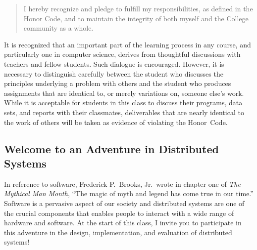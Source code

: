 \vspace*{-.1in}
\begin{quote}
I hereby recognize and pledge to fulfill my responsibilities, as defined in the Honor Code, and to maintain the
integrity of both myself and the College community as a whole.
\end{quote}
\vspace*{-.15in}

\noindent It is recognized that an important part of the learning process in any course, and particularly one in
computer science, derives from thoughtful discussions with teachers and fellow students.  Such dialogue is encouraged.
However, it is necessary to distinguish carefully between the student who discusses the principles underlying a problem
with others and the student who produces assignments that are identical to, or merely variations on, someone else's
work.  While it is acceptable for students in this class to discuss their programs, data sets, and reports with their
classmates, deliverables that are nearly identical to the work of others will be taken as evidence of violating the
\mbox{Honor Code}.

\subsection*{Welcome to an Adventure in Distributed Systems}

In reference to software, Frederick P.\ Brooks, Jr.\ wrote in chapter one of {\em The Mythical Man Month}, ``The magic
of myth and legend has come true in our time.'' Software is a pervasive aspect of our society and distributed systems
are one of the crucial components that enables people to interact with a wide range of hardware and software. At the
start of this class, I invite you to participate in this adventure in the design, implementation, and evaluation of
distributed systems!


